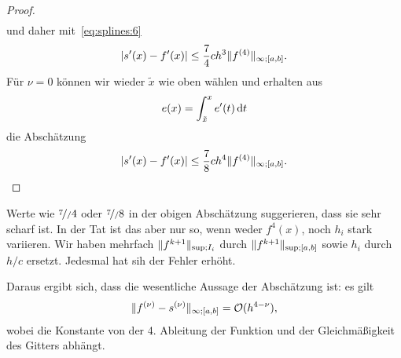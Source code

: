 \begin{proof}
\begin{gather}
  \end{gather}
  und daher mit~\eqref{eq:splines:6}
  \begin{gather}
    \lvert s'(x) - f'(x)\rvert \le \frac74 ch^3 \lVert f^{(4)}\rVert_{\infty;[a,b]}.
  \end{gather}
  Für $\nu=0$ können wir wieder $\tilde x$ wie oben wählen und erhalten aus
  \begin{gather}
    e(x) = \int_{\tilde x}^x e'(t)\,\mathrm{d} t
  \end{gather}
  die Abschätzung
  \begin{gather}
    \lvert s'(x) - f'(x)\rvert \le \frac78 ch^4 \lVert f^{(4)}\rVert_{\infty;[a,b]}.
  \end{gather}  
\end{proof}

\begin{remark}
  Werte wie $\nicefrac7/4$ oder $\nicefrac7/8$ in der obigen
  Abschätzung suggerieren, dass sie sehr scharf ist. In der Tat ist
  das aber nur so, wenn weder $f^{4}(x)$, noch $h_i$ stark
  variieren. Wir haben mehrfach $\lVert f^{k+1}\rVert_{\sup;I_i}$ durch
  $\lVert f^{k+1}\rVert_{\sup;[a,b]}$ sowie $h_i$ durch $h/c$
  ersetzt. Jedesmal hat sih der Fehler erhöht.

  Daraus ergibt sich, dass die wesentliche Aussage der Abschätzung ist: es gilt
  \begin{gather}
    \lVert f^{(\nu)}-s^{(\nu)}\rVert_{\infty;[a,b]}
    = \mathcal O(h^{4-\nu}),
  \end{gather}
  wobei die Konstante von der 4. Ableitung der Funktion und
  der Gleichmäßigkeit des Gitters abhängt.
\end{remark}

